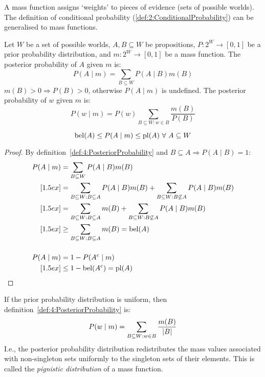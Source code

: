 A mass
function assigns `weights' to pieces of evidence (sets of possible worlds).
The definition of conditional probability (\ref{def:2:ConditionalProbability})
can be generalised to mass functions.

\begin{dfn}
  \label{def:4:PosteriorProbability}
  Let $W$ be a set of possible worlds, $A, B \subseteq W$ be propositions, $P :
    2^W \to [0, 1]$ be a prior probability distribution, and $m : 2^W \to [0, 1]$
  be a mass function.
  The posterior probability of $A$ given $m$ is:
  \begin{equation}
    P(A \mid m) = \sum_{B \subseteq W} P(A \mid B) m(B)
  \end{equation}
  $m(B) > 0
    \Rightarrow P(B) > 0$, otherwise $P(A \mid m)$ is undefined.
  The posterior probability of $w$ given $m$ is:
  \begin{equation}
    P(w \mid m) = P(w) \sum_{B \subseteq W : w \in B} \frac{m(B)}{P(B)}
  \end{equation}
\end{dfn}

\begin{thm}
  \begin{equation}
    \bel(A) \leq P(A \mid m) \leq \pl(A) \ \forall\ A \subseteq W
  \end{equation}
  \begin{proof}
    By definition~\ref{def:4:PosteriorProbability} and
    $B \subseteq A \Rightarrow P(A \mid B) = 1$:
    \begin{align*}
      P(A \mid m)
       & = \sum_{B \subseteq W} P(A \mid B) m(B)
      \\
      [1.5ex]
       & = \sum_{B \subseteq W : B \subseteq A} P(A \mid B) m(B)
      + \sum_{B \subseteq W : B \not\subseteq A} P(A \mid B) m(B)
      \\
      [1.5ex]
       & = \sum_{B \subseteq W : B \subseteq A} m(B)
      + \sum_{B \subseteq W : B \not\subseteq A} P(A \mid B) m(B)
      \\
      [1.5ex]
       & \geq \sum_{B \subseteq W : B \subseteq A} m(B) = \operatorname*{bel}(A)
      \\[3ex]
      P(A \mid m)
       & = 1 - P(A^c \mid m)
      \\
      [1.5ex]
       & \leq 1 - \operatorname*{bel}(A^c) = \operatorname*{pl}(A)
    \end{align*}
  \end{proof}
\end{thm}

If the prior probability distribution is uniform, then
definition~\ref{def:4:PosteriorProbability} is:
\begin{equation*}
  P(w \mid m) = \sum_{B \subseteq W : w \in B} \frac{m(B)}{|B|}
\end{equation*}
I.e., the posterior probability distribution redistributes the
mass values associated with non-singleton sets uniformly to the singleton sets
of their elements.
This is called the \textit{pignistic distribution} of a mass function.

